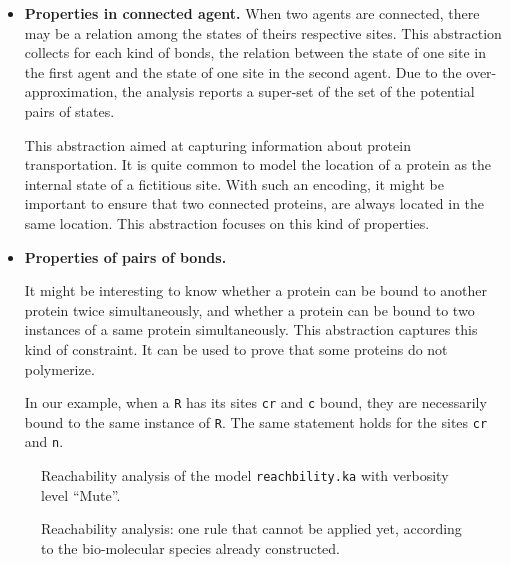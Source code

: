 \documentclass[11pt]{book}
\begin{document}
\begin{itemize}
\item \textbf{Properties in connected agent.}
When two agents are connected, there may be a relation among the states of theirs respective sites.  This abstraction \cite{Feret:SASB2016} collects for each kind of bonds, the relation between the state of one site in the first agent and the state of one site in the second agent.  Due to the over-approximation, the analysis reports a super-set of the set of the potential pairs of states.

This abstraction aimed at capturing information about protein transportation.
It is quite common to model the location of a protein as the internal state of  a fictitious site. With such an encoding, it might be important to ensure that two connected proteins, are always located in the same location. This abstraction focuses on this kind of properties.

\item \textbf{Properties of pairs of bonds.}

It might be interesting to know whether a protein can be bound to another protein twice simultaneously, and whether a protein can be bound to two instances of a same protein simultaneously. This abstraction \cite{Feret:SASB2016} captures this kind of constraint. It can be used to prove that some proteins do not polymerize.

In our example, when a \texttt{R} has its sites \texttt{cr} and \texttt{c} bound, they are necessarily bound to the same instance of \texttt{R}. The same statement holds for the sites \texttt{cr} and \texttt{n}.
\end{itemize}




\begin{figure}[t]

\caption{Reachability analysis of the model \texttt{reachbility.ka} with verbosity level ``Mute''.}
\label{fig:reachability_mute}
\end{figure}
%
\begin{figure}[t]

\caption{Reachability analysis: one rule that cannot be applied yet, according to the bio-molecular species already constructed.}
\label{fig:reachability_medium_ko}
\end{figure}
\end{document}
